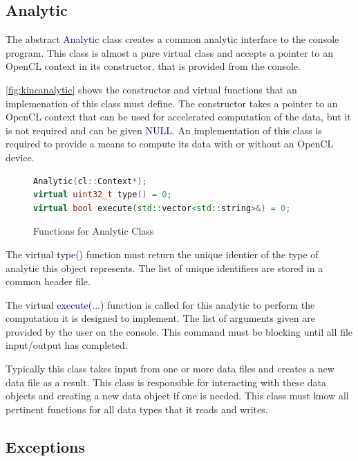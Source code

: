 \documentclass[10pt]{article}
\providecommand{\h}[1]{\textcolor{darkblue}{#1}}
\begin{document}
\subsection{Analytic}

The abstract \h{Analytic} class creates a common analytic interface to the 
console program. This class is almost a pure virtual class and accepts a 
pointer to an OpenCL context in its constructor, that is provided from the 
console.

\autoref{fig:kincanalytic} shows the constructor and virtual functions that an 
implemenation of this class must define. The constructor takes a pointer to an 
OpenCL context that can be used for accelerated computation of the data, but it 
is not required and can be given \h{NULL}. An implementation of this class is 
required to provide a means to compute its data with or without an OpenCL 
device.

\begin{figure}[H]
\begin{mdframed}[style=functions]
\begin{lstlisting}[language=C++]
Analytic(cl::Context*);
virtual uint32_t type() = 0;
virtual bool execute(std::vector<std::string>&) = 0;
\end{lstlisting}
\end{mdframed}
\caption{Functions for Analytic Class}
\label{fig:kincanalytic}
\end{figure}

The virtual \h{type()} function must return the unique identier of the type of 
analytic this object represents. The list of unique identifiers are stored in a 
common header file.

The virtual \h{execute(...)} function is called for this analytic to perform 
the computation it is designed to implement. The list of arguments given are 
provided by the user on the console. This command must be blocking until all 
file input/output has completed.

Typically this class takes input from one or more data files and creates a new 
data file as a result. This class is responsible for interacting with these 
data objects and creating a new data object if one is needed. This class must 
know all pertinent functions for all data types that it reads and writes.

\subsection{Exceptions}
\end{document}
